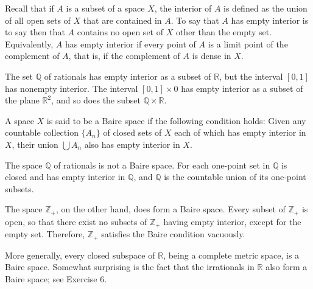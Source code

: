 \begin{definition}
Recall that if \(A\) is a subset of a space \(X\), the interior of \(A\) is defined as the union of all open sets of \(X\) that are contained in \(A\). To say that \(A\) has empty interior is to say then that \(A\) contains no open set of \(X\) other than the empty set. Equivalently, \(A\) has empty interior if every point of \(A\) is a limit point of the complement of \(A\), that is, if the complement of \(A\) is dense in \(X\).
\end{definition}

\begin{centeredblock}
\begin{example}
\label{ex:\thesection.\theexample}
The set \(\mathbb{Q}\) of rationals has empty interior as a subset of \(\mathbb{R}\), but the interval \([ {0,1}]\) has nonempty interior. The interval \([ {0,1}] \times 0\) has empty interior as a subset of the plane \(\mathbb{R}^{2}\), and so does the subset \(\mathbb{Q} \times \mathbb{R}\).
\end{example}
\end{centeredblock}

\begin{definition}
A space \(X\) is said to be a Baire space if the following condition holds: Given any countable collection \(\{ A_{n}\}\) of closed sets of \(X\) each of which has empty interior in \(X\), their union \(\bigcup {A}_{n}\) also has empty interior in \(X\).
\end{definition}

\begin{centeredblock}
\begin{example}
\label{ex:\thesection.\theexample}
The space \(\mathbb{Q}\) of rationals is not a Baire space. For each one-point set in \(\mathbb{Q}\) is closed and has empty interior in \(\mathbb{Q}\), and \(\mathbb{Q}\) is the countable union of its one-point subsets.
\end{example}
\end{centeredblock}

The space \(\mathbb{Z}_{ + }\), on the other hand, does form a Baire space. Every subset of \(\mathbb{Z}_{ + }\) is open, so that there exist no subsets of \(\mathbb{Z}_{ + }\) having empty interior, except for the empty set. Therefore, \(\mathbb{Z}_{ + }\) satisfies the Baire condition vacuously.

More generally, every closed subspace of \(\mathbb{R}\), being a complete metric space, is a Baire space. Somewhat surprising is the fact that the irrationals in \(\mathbb{R}\) also form a Baire space; see Exercise 6\*.

